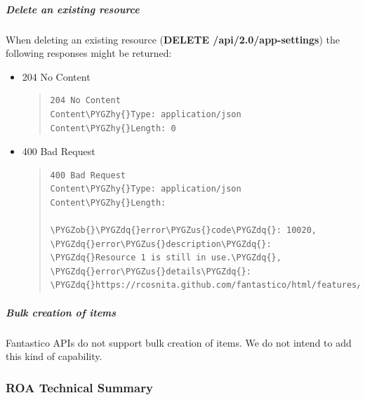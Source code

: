 \documentclass[letterpaper,10pt,english]{sphinxmanual}
\def\PYGZus{\char`\_}
\def\PYGZob{\char`\{}
\def\PYGZcb{\char`\}}
\def\PYGZhy{\char`\-}
\def\PYGZdq{\char`\"}
\begin{document}
\subparagraph{Delete an existing resource}
\label{features/roa/rest_responses:delete-an-existing-resource}
When deleting an existing resource (\textbf{DELETE /api/2.0/app-settings}) the following responses might be returned:
\begin{itemize}
\item {} 
204 No Content
\begin{quote}

\begin{Verbatim}[commandchars=\\\{\}]
204 No Content
Content\PYGZhy{}Type: application/json
Content\PYGZhy{}Length: 0
\end{Verbatim}
\end{quote}

\item {} 
400 Bad Request
\begin{quote}

\begin{Verbatim}[commandchars=\\\{\}]
400 Bad Request
Content\PYGZhy{}Type: application/json
Content\PYGZhy{}Length:

\PYGZob{}\PYGZdq{}error\PYGZus{}code\PYGZdq{}: 10020, \PYGZdq{}error\PYGZus{}description\PYGZdq{}: \PYGZdq{}Resource 1 is still in use.\PYGZdq{}, \PYGZdq{}error\PYGZus{}details\PYGZdq{}: \PYGZdq{}https://rcosnita.github.com/fantastico/html/features/roa/1000x.html\PYGZdq{}\PYGZcb{}
\end{Verbatim}
\end{quote}

\end{itemize}


\subparagraph{Bulk creation of items}
\label{features/roa/rest_responses:bulk-creation-of-items}
Fantastico APIs do not support bulk creation of items. We do not intend to add this kind of capability.


\subsubsection{ROA Technical Summary}
\label{features/roa/technical_summary:roa-technical-summary}\label{features/roa/technical_summary::doc}
\end{document}

